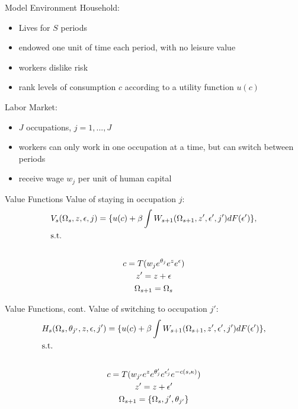 \documentclass{beamer}
\begin{document}
\begin{frame}{Model Environment}
  Household:
  \begin{itemize}
    \item Lives for $S$ periods
    \item endowed one unit of time each period, with no leisure value
    \item workers dislike risk
    \item rank levels of consumption $c$ according to a utility function $u(c)$
  \end{itemize}
  \pause
  Labor Market:
  \begin{itemize}
    \item $J$ occupations, $j=1,...,J$
    \item workers can only work in one occupation at a time, but can switch between periods
    \item receive wage $w_j$ per unit of human capital
  \end{itemize}
\end{frame}
\begin{frame}{Value Functions}
  Value of staying in occupation $j$:
  \begin{gather*}
    V_s(\Omega_s, z, \epsilon, j) = \{u(c) + \beta\int W_{s+1}(\Omega_{s+1}, z', \epsilon', j')dF(\epsilon')\}, \\
    \shortintertext{s.t.} \\
    c = T(w_je^{\theta_j}e^ze^{\epsilon}) \\
    z' = z + \epsilon \\
    \Omega_{s+1} = \Omega_s
  \end{gather*}
\end{frame}
\begin{frame}{Value Functions, cont.}
  Value of switching to occupation $j'$:
  \begin{gather*}
    H_s(\Omega_s, \theta_{j'}, z, \epsilon, j') = \{u(c) + \beta\int W_{s+1}(\Omega_{s+1}, z', \epsilon', j')dF(\epsilon')\}, \\
    \shortintertext{s.t.} \\
    c = T(w_{j'}e^ze^{\theta_j'}e^{\epsilon_j'}e^{-c(s,\kappa)}) \\
    z' = z+ \epsilon' \\
    \Omega_{s+1} = \{\Omega_s, j', \theta_{j'}\}
  \end{gather*}
\end{frame}
\end{document}

